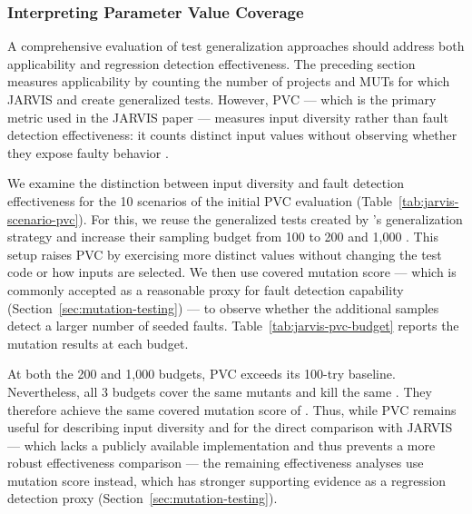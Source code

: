 \subsubsection{Interpreting Parameter Value Coverage}%
\label{sec:jarvis-pvc-budget}

A comprehensive evaluation of test generalization approaches
should address both applicability
and regression detection effectiveness.
The preceding section measures applicability
by counting the number of projects and MUTs
for which JARVIS and \ToolTeralizer{} create generalized tests.
However, PVC --- which is the primary metric used in the JARVIS paper ---
measures input diversity rather than fault detection effectiveness:
it counts distinct input values without observing whether they expose faulty behavior
\cite{sampath_2008_prioritizing,inozemtseva_2014_coverage,peleg_2018_jarvis}.

We examine the distinction between input diversity and fault detection effectiveness
for the 10 scenarios of the initial PVC evaluation (Table~\ref{tab:jarvis-scenario-pvc}).
For this, we reuse the generalized tests created by \ToolTeralizer{}'s
\VariantImproved{} generalization strategy
and increase their sampling budget from 100 to 200 and 1,000 \tries{}.
This setup raises PVC by exercising more distinct values
without changing the test code or how inputs are selected.
We then use covered mutation score ---
which is commonly accepted as a reasonable proxy
for fault detection capability (Section~\ref{sec:mutation-testing})
--- to observe whether the additional samples detect a larger number of seeded faults.
Table~\ref{tab:jarvis-pvc-budget} reports the mutation results at each budget.



At both the 200 and 1,000 \tries{} budgets, PVC exceeds its 100-try baseline.
Nevertheless, all 3 budgets cover the same
\TzRqzeroBudgetImprovedOnezerozeroTriesCoveredMutants{} mutants
and kill the same
\TzRqzeroBudgetImprovedOnezerozeroTriesKilledMutants{}.
They therefore achieve the same covered mutation score of
\TzRqzeroBudgetImprovedOnezerozeroTriesCoveredMutationScore{}.
Thus, while PVC remains useful for describing input diversity
and for the direct comparison with JARVIS
--- which lacks a publicly available implementation and thus
prevents a more robust effectiveness comparison ---
the remaining effectiveness analyses use mutation score instead,
which has stronger supporting evidence as a regression detection proxy
(Section~\ref{sec:mutation-testing}).

